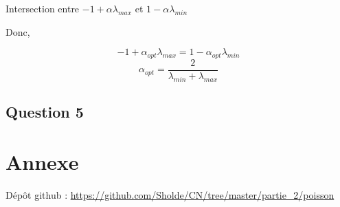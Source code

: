 \documentclass[11pt]{article}
\begin{document}
Intersection entre $-1 + \alpha \lambda_{max}$ et $1 - \alpha
\lambda_{min}$ \newline

\vspace{5mm}

Donc,

$$ -1 + \alpha_{opt} \lambda_{max} = 1 - \alpha_{opt} \lambda_{min} $$
$$ \alpha_{opt} = \frac{2}{\lambda_{min} + \lambda_{max}} $$

\subsection{Question 5}

\section{Annexe}

Dépôt github : \url{https://github.com/Sholde/CN/tree/master/partie_2/poisson}
\end{document}
